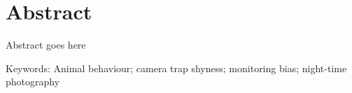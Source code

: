 \chapter{Abstract}

Abstract goes here

Keywords:
Animal behaviour; camera trap shyness; monitoring bias; night-time photography
